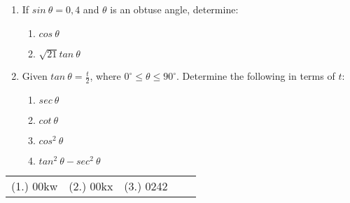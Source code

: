 \begin{exercises}{}
{\begin{enumerate}[itemsep=5pt, label=\textbf{\arabic*}. ]
\item If $sin~ \theta= 0,4$ and $\theta$ is an obtuse angle, determine:
\begin{enumerate}[noitemsep, label=\textbf{(\alph*)} ]
 \item $cos~ \theta$
\item $\sqrt{21} tan~ \theta$
\end{enumerate}
\item Given $tan~ \theta = \frac{t}{2}$, where $0^{\circ} \leq \theta \leq 90^{\circ}$.
Determine the following in terms of $t$:
\begin{enumerate}[noitemsep, label=\textbf{(\alph*)} ]
\item $sec~ \theta$
\item $cot~ \theta$
\item $cos^2~ \theta$
\item $tan^2~ \theta-sec^2~ \theta$
\end{enumerate}
\end{enumerate}
\par \practiceinfo
\par \begin{tabular}[h]{ccccc}
(1.)	00kw	&
(2.)	00kx	& (3.) 0242	& 
\end{tabular}
}
\end{exercises}

